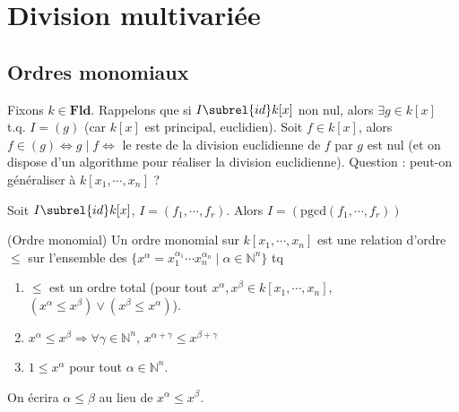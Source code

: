     \section{Division multivariée}
        \subsection{Ordres monomiaux}
            Fixons $k \in \mathbf{Fld}$. Rappelons que si $I \subrel{id} k[x]$ non nul, alors $\exists g \in k[x]$ t.q. $I = (g)$ (car $k[x]$ est principal, euclidien). Soit $f \in k[x]$, alors $f \in (g) \iff g \mid f \iff $ le reste de la division euclidienne de $f$ par $g$ est nul (et on dispose d'un algorithme pour réaliser la division euclidienne). Question : peut-on généraliser à $k[x_1, \cdots, x_n]$ ? 
            \begin{remq}
                Soit $I \subrel{id} k[x]$, $I = (f_1, \cdots, f_r)$. Alors $I = (\mathrm{pgcd}(f_1, \cdots, f_r))$
            \end{remq}
            \begin{defi} (Ordre monomial)
                \label{ordre_mono}
                Un ordre monomial sur $k[x_1, \cdots, x_n]$ est une relation d'ordre $\leq$ sur l'ensemble des $\{x^\alpha = x_1^{\alpha_1} \cdots x_n^{\alpha_n} \mid \alpha \in \mathbb{N}^n\}$ tq
                \begin{enumerate}
                    \item $\leq$ est un ordre total (pour tout $x^\alpha, x^\beta \in k[x_1, \cdots, x_n]$, $(x^\alpha \leq x^\beta) \lor (x^\beta \leq x^\alpha)$).
                    \item $x^\alpha \leq x^\beta \Rightarrow \forall \gamma \in \mathbb{N}^n,\, x^{\alpha + \gamma} \leq x^{\beta + \gamma}$
                    \item $1 \leq x^\alpha$ pour tout $\alpha \in \mathbb{N}^n$.
                \end{enumerate}
            \end{defi}
            \begin{nota}
                On écrira $\alpha \leq \beta$ au lieu de $x^\alpha \leq x^\beta$.
            \end{nota}

